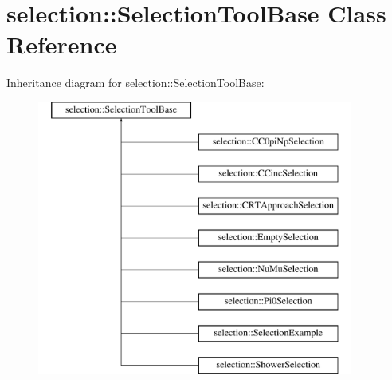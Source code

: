 \hypertarget{classselection_1_1SelectionToolBase}{}\section{selection\+:\+:Selection\+Tool\+Base Class Reference}
\label{classselection_1_1SelectionToolBase}
Inheritance diagram for selection\+:\+:Selection\+Tool\+Base\+:\begin{figure}[H]
\begin{center}
\leavevmode
\includegraphics[height=9.000000cm]{classselection_1_1SelectionToolBase}
\end{center}
\end{figure}
